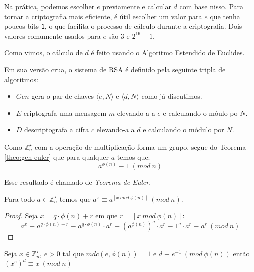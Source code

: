 Na prática, podemos escolher $e$ previamente e calcular $d$ com base nisso.
Para tornar a criptografia mais eficiente, é útil escolher um valor para $e$ que tenha poucos bits {\tt 1}, o que facilita o processo de cálculo durante a criptografia.
Dois valores comumente usados para $e$ são $3$ e $2^{16} + 1$.

Como vimos, o cálculo de $d$ é feito usando o Algoritmo Estendido de Euclides.



Em sua versão crua, o sistema de RSA é definido pela seguinte tripla de algoritmos:

\begin{itemize}
\item $Gen$ gera o par de chaves $\langle e, N \rangle$ e $\langle d, N \rangle$ como já discutimos.
\item $E$ criptografa uma mensagem $m$ elevando-a a $e$ e calculando o móulo po $N$. 
\item $D$ descriptografa a cifra $c$ elevando-a a $d$ e calculando o módulo por $N$.
\end{itemize}

Como $\mathbb{Z}_n^\star$ com a operação de multiplicação forma um grupo, segue do Teorema \ref{theo:gen-euler} que para qualquer $a$ temos que:
\begin{displaymath}
  a^{\phi(n)} \equiv 1\ (mod\ n)
\end{displaymath}

Esse resultado é chamado de {\em Teorema de Euler}.

\begin{corollary}
  Para todo $a \in \mathbb{Z}_n^\star$ temos que $a^x \equiv a^{[x\ mod\ \phi(n)]}\ (mod\ n)$.
\end{corollary}
\begin{proof}
  Seja $x = q \cdot \phi(n) + r$ em que $r = [x\ mod\ \phi(n)]$:
  \begin{displaymath}
    a^x \equiv a^{q \cdot \phi(n) + r} \equiv a^{q \cdot \phi(n)} \cdot a^r \equiv (a^{\phi(n)})^q \cdot a^r \equiv 1^q \cdot a^r \equiv a^r\ (mod\ n)
  \end{displaymath}
\end{proof}


\begin{corollary}
\label{cor:euler}
Seja $x \in \mathbb{Z}_n^\star$, $e > 0$ tal que $mdc(e, \phi(n)) = 1$ e $d \equiv e^{-1}\ (mod\ \phi(n))$ então $(x^e)^d \equiv x\ (mod\ n)$
\end{corollary}

